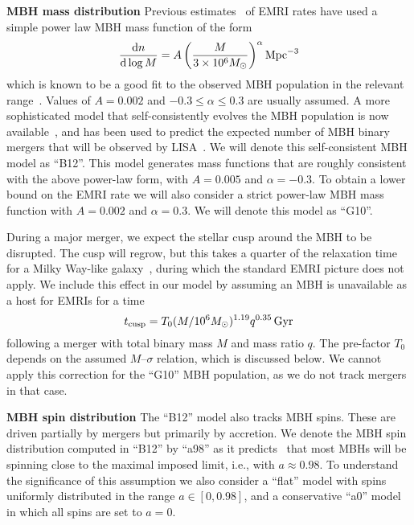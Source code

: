 \documentclass[a4paper]{jpconf}
\begin{document}
{\bf MBH mass distribution} Previous estimates~\cite{JG09} of EMRI rates have used a simple power law MBH mass function of the form
\begin{equation}
\frac{{\rm d}n}{{\rm d}\log M} = A \left(\frac{M}{3\times 10^6 M_\odot} \right)^\alpha \mathrm{Mpc}^{-3}
\end{equation}
which is known to be a good fit to the observed MBH population in the relevant range~\cite{GTV}. Values of $A=0.002$ and $-0.3 \leq \alpha \leq 0.3$ are usually assumed. A more sophisticated model that self-consistently evolves the MBH population is now available~\cite{Barausse12}, and has been used to predict the expected number of MBH binary mergers that will be observed by LISA~\cite{GOATMBH}. We will denote this self-consistent MBH model as ``B12''. This model generates mass functions that are roughly consistent with the above power-law form, with $A=0.005$ and $\alpha=-0.3$. To obtain a lower bound on the EMRI rate we will also consider a strict power-law MBH mass function with $A=0.002$ and $\alpha=0.3$. We will denote this model as ``G10''.

During a major merger, we expect the stellar cusp around the MBH to be disrupted. The cusp will regrow, but this takes a quarter of the relaxation time for a Milky Way-like galaxy~\cite{PretoAS10}, during which the standard EMRI picture does not apply. We include this effect in our model by assuming an MBH is unavailable as a host for EMRIs for a time
\begin{equation}
t_{\rm cusp}= T_0 (M/10^6M_\odot)^{1.19} q^{0.35}\,\mathrm{Gyr}
\label{eq:cuspregrow}
\end{equation}
following a merger with total binary mass $M$ and mass ratio $q$. The pre-factor $T_0$ depends on the assumed $M$--$\sigma$ relation, which is discussed below. We cannot apply this correction for the ``G10'' MBH population, as we do not track mergers in that case.

{\bf MBH spin distribution} The ``B12'' model also tracks MBH spins. These are driven partially by mergers but primarily by accretion. We denote the MBH spin distribution computed in ``B12'' by ``a98'' as it predicts~\cite{SBRD14} that most MBHs will be spinning close to the maximal imposed limit, i.e., with $a\approx 0.98$. To understand the significance of this assumption we also consider a ``flat'' model with spins uniformly distributed in the range $a \in [0,0.98]$, and a conservative ``a0'' model in which all spins are set to $a=0$.
\end{document}

